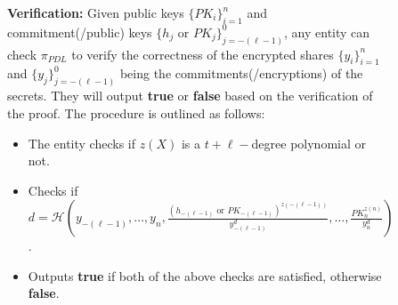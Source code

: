 \begin{figure}[ht]
{\begin{tcolorbox}[title=\textbf{$\Lambda_{RO}^{'}$}, width=1.2\textwidth, colframe=blue!75!black, colback=blue!10, sharp corners]
        \vspace{0.5em}
        \textbf{Verification:}
            Given public keys $\{PK_i\}_{i=1}^n$ and commitment(/public) keys $\{h_j\text{ or }PK_j\}_{j=-(\ell-1)}^0$, any entity can check 
            $\pi_{PDL}$ to verify the correctness of the encrypted shares $\{y_i\}_{i=1}^n$ and $\{y_j\}_{j=-(\ell-1)}^0$ being the commitments(/encryptions) of the secrets. 
            They will output \textbf{true} or \textbf{false} based on the verification of the proof. The 
            procedure is outlined as follows:
        \begin{itemize}
            \item The entity checks if $z(X)$ is a $t+\ell-$degree polynomial or not.
            \item Checks if $d=\mathcal{H}(y_{-(\ell-1)},\dots,y_n,\frac{(h_{-(\ell-1)}\text{ or }PK_{-(\ell-1)})^{z(-(\ell-1))}}{y_{-(\ell-1)}^d},\dots,\frac{PK_n^{z(n)}}{y_n^d})$.
            \item Outputs \textbf{true} if both of the above checks are satisfied, otherwise \textbf{false}.
        \end{itemize}


\end{tcolorbox}}
\end{figure}
